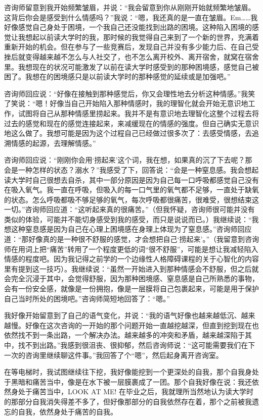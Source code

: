 咨询师留意到我开始频繁皱眉，并说：“我会留意到你从刚刚开始就频繁地皱眉。这背后你会是感受到什么情感吗？”我说：“嗯，我还真的是一直在皱眉。Em……我好像感觉自己身处于困境，一个我自己还没能找到出路的困境。这种陷入困境的感觉让我想起以前读大学时的我，那时候的我觉得自己来到了一个新的世界，充满着重新开始的机会。但在参与了一些竞赛后，发现自己并没有多少能力后、在自己受挫后就变得越来越不怎么与人社交了，也不怎么离开校外、离开宿舍，就窝在宿舍里。我想现在的状况可能激发了以前在读大学时感受到的那种困境感，感觉自己被困了。我想在的困境感只是以前读大学时的那种感觉的延续或是加强吧。”

咨询师回应说：“好像在接触到那种感觉后，你又会理性地去分析这种情感。”我笑了笑说：“嗯！好像当自己开始陷入那种情感时，我的理智化就会开始无意识地工作，试图将自己从那种情感里捞起来。我并不是有意识地去理智化这整个过程\pozhehao{}去将过去的感觉和现在的感觉连接起来，来减缓现在的情感的强度。但自己确实无意识地这么做了。我想可能是因为这个过程自己已经做过很多次了：去感受情感，去追溯情感的起源，去理解情感。”

咨询师回应说：“刚刚你会用‘捞起来’这个词，我在想，如果真的沉了下去呢？那会是一种怎样的状态？溺水？”我感受了下，回答说：“会是一种窒息感。我会想起读大学时自己很想去自杀，其中一部分原因是因为自己每一口呼吸都感觉自己没有在吸入氧气。我一直在呼吸，但吸入的每一口气里的氧气都不足够，一直处于缺氧的状态。怎么呼吸都吸不够足够的氧气，每次呼吸都很痛苦，很难受，很想结束这一切。”咨询师回应道：“这听起来真的很痛苦。”（但我怀疑，咨询师很可能并没有类似的体验，可能并不能切身感受到我的感受，而只是说说而已。）我继续说：“我想这种窒息感是因为自己在心理上困境感在身理上体现为了窒息感。”咨询师回应道：“那好像真的是一种很不舒服的感觉，才会想把自己‘捞起来’。”（我留意到咨询师在用词上把“痛苦”转用了一个程度更低的词“很不舒服”，可能是想让我减轻陷入情感的程度吧。因为我记得之前学的一个边缘性人格障碍课程的关于心智化的内容里有提到这一技巧）。我继续说：“虽然一开始进入到那种情感会不舒服，但之后就会完全沉浸于其中，会觉得舒服，因为那种困境感、窒息感是自己所熟悉的事物，会有一份安全感，就像是一份拥抱，像是一层膜将自己包裹起来，可能是用于保护自己当时所处的困境吧。”咨询师简短地回答了：“嗯。”

我好像开始留意到了自己的语气变化，并说：“我的语气好像也越来越低沉、越来越慢。好像在这次咨询的一开始的那个问题开始一直越挖越深，但直到挖到现在也依然找不到一条出路，一个解决办法。越来越多的冲突和矛盾，越来越深陷于其中，找不到出路。”我感到很沮丧、很抑郁，然后咨询师说：“这可能需要我们在下一次的咨询里继续聊这件事。”我回答了个“嗯”，然后起身离开咨询室。

在等电梯时，我试图继续往下挖，我好像能挖到一个更深处的自我，那个自我身处于黑暗和痛苦当中，像是在水下被一层膜裹成了一团。那个自我好像在说：我还依然身处于痛苦当中，LOOK AT ME! 在毕业之后，我就理所当然地认为读大学时的那部分自我消失得差不多了，但好像那部分的自我依然存在着，那个之前被我遗忘的自我，依然身处于痛苦的自我。


